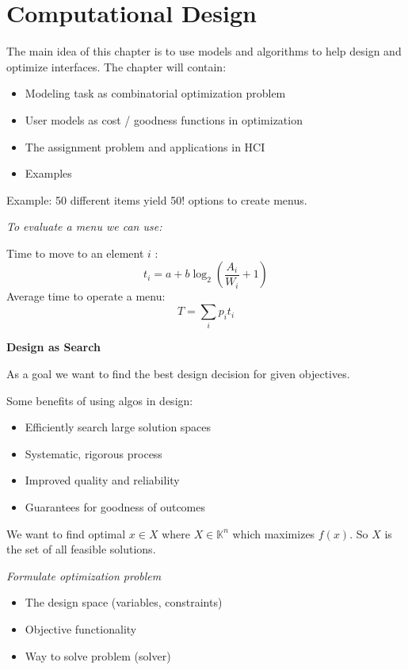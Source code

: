 \section{Computational Design}

The main idea of this chapter is to use models and algorithms to help design and optimize interfaces. The chapter will contain: 

\begin{itemize}[itemsep=-5pt, topsep=0pt, leftmargin=*]
	\item Modeling task as combinatorial optimization problem
	\item User models as cost / goodness functions in optimization
	\item The assignment problem and applications in HCI
	\item Examples
\end{itemize}

Example: 50 different items yield 50! options to create menus. 

\smallskip

\textit{To evaluate a menu we can use:} \medskip

Time to move to an element $i$ :
$$t_i = a + b \log_2 \left( \frac{A_i}{W_i} + 1 \right)$$
Average time to operate a menu:
$$T = \sum_{i} p_i t_i$$

\textbf{Design as Search}

As a goal we want to find the best design decision for given objectives. \medskip

Some benefits of using algos in design: 


\begin{itemize}[itemsep=-5pt, topsep=0pt, leftmargin=*]
	\item Efficiently search large solution spaces
	\item Systematic, rigorous process
	\item Improved quality and reliability
	\item Guarantees for goodness of outcomes
\end{itemize}

We want to find optimal $x \in X$ where $X \in \mathbb{K}^n$ which maximizes $f(x)$. So $X$ is the set of all feasible solutions. \medskip

\textit{Formulate optimization problem}
 \begin{multicols}{2}
    \begin{itemize}[itemsep=-5pt, topsep=0pt, leftmargin=*]
        \item The design space (variables, constraints)
        \item Objective functionality
        \item Way to solve problem (solver)
    \end{itemize}
 \end{multicols}
    

